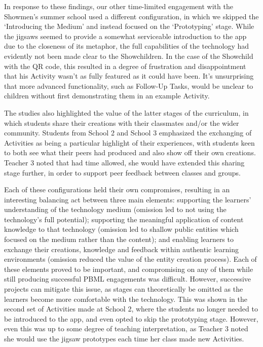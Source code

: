 \documentclass[,hyphens]{sigchi}
\begin{document}
In response to these findings, our other time-limited engagement with the Showmen's summer school used a different configuration, in which we skipped the `Introducing the Medium' and instead focused on the `Prototyping' stage. While the jigsaws seemed to provide a somewhat serviceable introduction to the app due to the closeness of its metaphor, the full capabilities of the technology had evidently not been made clear to the Showchildren. In the case of the Showchild with the QR code, this resulted in a degree of frustration and disappointment that his Activity wasn't as fully featured as it could have been. It's unsurprising that more advanced functionality, such as Follow-Up Tasks, would be unclear to children without first demonstrating them in an example Activity.

The studies also highlighted the value of the latter stages of the curriculum, in which students share their creations with their classmates and/or the wider community. Students from School 2 and School 3 emphasized the exchanging of Activities as being a particular highlight of their experiences, with students keen to both see what their peers had produced and also show off their own creations. Teacher 3 noted that had time allowed, she would have extended this sharing stage further, in order to support peer feedback between classes and groups.

Each of these configurations held their own compromises, resulting in an interesting balancing act between three main elements: supporting the learners' understanding of the technology medium (omission led to not using the technology's full potential); supporting the meaningful application of content knowledge to that technology (omission led to shallow public entities which focused on the medium rather than the content); and enabling learners to exchange their creations, knowledge and feedback within authentic learning environments (omission reduced the value of the entity creation process). Each of these elements proved to be important, and compromising on any of them while still producing successful PBML engagements was difficult. However, successive projects can mitigate this issue, as stages can theoretically be omitted as the learners become more comfortable with the technology. This was shown in the second set of Activities made at School 2, where the students no longer needed to be introduced to the app, and even opted to skip the prototyping stage. However, even this was up to some degree of teaching interpretation, as Teacher 3 noted she would use the jigsaw prototypes each time her class made new Activities. 
\end{document}
